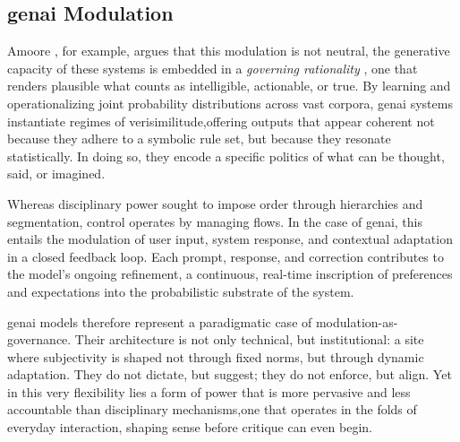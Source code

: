 \subsection{\Gls{genai} Modulation }



Amoore \parencite*{amoore2024}, for example, argues that this modulation is not neutral, the generative capacity of these systems is embedded in a \textit{governing rationality} \parencite{amoore2024}, one that renders plausible what counts as intelligible, actionable, or true. By learning and operationalizing joint probability distributions across vast corpora, \gls{genai} systems instantiate regimes of verisimilitude,offering outputs that appear coherent not because they adhere to a symbolic rule set, but because they resonate statistically. In doing so, they encode a specific politics of what can be thought, said, or imagined.

Whereas disciplinary power sought to impose order through hierarchies and segmentation, control operates by managing flows. In the case of \gls{genai}, this entails the modulation of user input, system response, and contextual adaptation in a closed feedback loop. Each prompt, response, and correction contributes to the model’s ongoing refinement, a continuous, real-time inscription of preferences and expectations into the probabilistic substrate of the system.

\Gls{genai} models therefore represent a paradigmatic case of modulation-as-governance. Their architecture is not only technical, but institutional: a site where subjectivity is shaped not through fixed norms, but through dynamic adaptation. They do not dictate, but suggest; they do not enforce, but align. Yet in this very flexibility lies a form of power that is more pervasive and less accountable than disciplinary mechanisms,one that operates in the folds of everyday interaction, shaping sense before critique can even begin.

